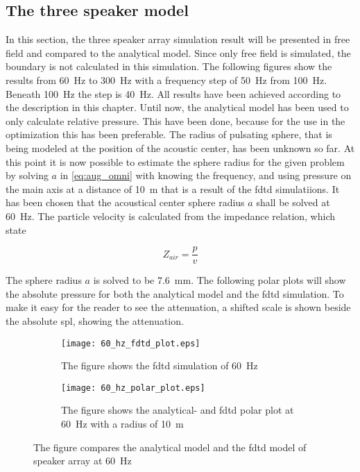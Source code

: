 \subsection{The three speaker model} \label{the_simulation_result}
In this section, the three speaker array simulation result will be presented in free field and compared to the analytical model. Since only free field is simulated, the boundary is not calculated in this simulation. The following figures show the results from \SI{60}{\hertz} to \SI{300}{\hertz} with a frequency step of \SI{50}{\hertz} from \SI{100}{\hertz}. Beneath \SI{100}{\hertz} the step is \SI{40}{\hertz}. All results have been achieved according to the description in this chapter. Until now, the analytical model has been used to only calculate relative pressure. This have been done, because for the use in the optimization this has been preferable. The radius of pulsating sphere, that is being modeled at the position of the acoustic center, has been unknown so far. At this point it is now possible to estimate the sphere radius for the given problem by solving $a$ in \autoref{eq:aug_omni} with knowing the frequency, and using pressure on the main axis at a distance of \SI{10}{\meter} that is a result of the \gls{fdtd} simulatiions. It has been chosen that the acoustical center sphere radius $a$ shall be solved at \SI{60}{\hertz}. The particle velocity is calculated from the impedance relation, which state

\begin{equation}
Z_{air}=\frac{p}{v}
\end{equation}  

    \startexplain
    \stopexplain

The sphere radius $a$ is solved to be \SI{7.6}{\milli\meter}. The following polar plots will show the absolute pressure for both the analytical model and the \gls{fdtd} simulation. To make it easy for the reader to see the attenuation, a shifted scale is shown beside the absolute \gls{spl}, showing the attenuation.




\begin{figure}[H]
\centering
\begin{subfigure}[htbp]{0.55\textwidth}
		\texttt{[image: 60\_hz\_fdtd\_plot.eps]}
		\caption{The figure shows the \gls{fdtd} simulation of \SI{60}{\hertz}}
		\label{fig:fdtd_60_Hz}
\end{subfigure}
\begin{subfigure}[htbp]{0.35\textwidth}
		\texttt{[image: 60\_hz\_polar\_plot.eps]}
		\caption{The figure shows the analytical- and \gls{fdtd} polar plot at \SI{60}{\hertz} with a radius of \SI{10}{\meter}}
		\label{fig:polar_60_Hz}
\end{subfigure} 
\caption{The figure compares the analytical model and the \gls{fdtd} model of speaker array at \SI{60}{\hertz}}
\end{figure}


